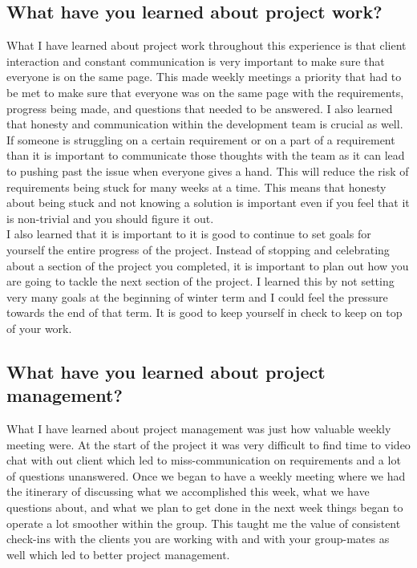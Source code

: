 \documentclass[draftclsnofoot,10pt,onecolumn]{IEEEtran} %
\begin{document}
\subsection{What have you learned about project work?}

What I have learned about project work throughout this experience is that client
interaction and constant communication is very important to make sure that
everyone is on the same page. This made weekly meetings a priority that had to
be met to make sure that everyone was on the same page with the requirements,
progress being made, and questions that needed to be answered. I also learned
that honesty and communication within the development team is crucial as well.
If someone is struggling on a certain requirement or on a part of a requirement
than it is important to communicate those thoughts with the team as it can lead
to pushing past the issue when everyone gives a hand. This will reduce the risk
of requirements being stuck for many weeks at a time. This means that honesty
about being stuck and not knowing a solution is important even if you feel that
it is non-trivial and you should figure it out. \\

I also learned that it is important to it is good to continue to set goals for
yourself the entire progress of the project.  Instead of stopping and
celebrating about a section of the project you completed, it is important to
plan out how you are going to tackle the next section of the project. I learned
this by not setting very many goals at the beginning of winter term and I could
feel the pressure towards the end of that term. It is good to keep yourself in
check to keep on top of your work.

\subsection{What have you learned about project management?}

What I have learned about project management was just how valuable weekly
meeting were. At the start of the project it was very difficult to find time to
video chat with out client which led to miss-communication on requirements and a
lot of questions unanswered. Once we began to have a weekly meeting where we had
the itinerary of discussing what we accomplished this week, what we have
questions about, and what we plan to get done in the next week things began to
operate a lot smoother within the group. This taught me the value of consistent
check-ins with the clients you are working with and with your group-mates as
well which led to better project management. \\
\end{document}

